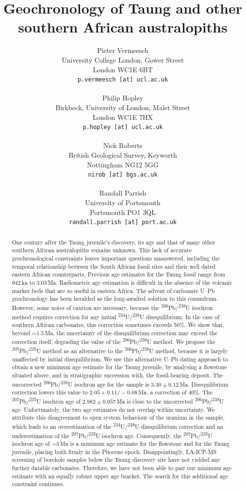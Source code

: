 \documentclass[11pt]{article}
\title{Geochronology of Taung and other southern African australopiths}
\author{Pieter Vermeesch\\
  University College London, Gower Street\\
  London WC1E 6BT\\
  \texttt{p.vermeesch [at] ucl.ac.uk}\\~\\
  Philip Hopley \\
  Birkbeck, University of London, Malet Street\\
  London WC1E 7HX\\
  \texttt{p.hopley [at] ucl.ac.uk}\\~\\
  Nick Roberts \\
  British Geological Survey, Keyworth\\
  Nottingham NG12 5GG \\
  \texttt{nirob [at] bgs.ac.uk}\\~\\
  Randall Parrish \\
  University of Portsmouth\\
  Portsmouth PO1 3QL\\
  \texttt{randall.parrish [at] port.ac.uk}
  }
\begin{document}
\maketitle

\begin{abstract}
  One century after the Taung juvenile's discovery, its age and that
  of many other southern African australopiths remains unknown.  This
  lack of accurate geochronological constraints leaves important
  questions unanswered, including the temporal relationship between
  the South African fossil sites and their well dated eastern African
  counterparts.  Previous age estimates for the Taung fossil range
  from 942\,ka to 3.03\,Ma. Radiometric age estimation is difficult in
  the absence of the volcanic marker beds that are so useful in
  eastern Africa. The advent of carbonate U--Pb geochronology has been
  heralded as the long-awaited solution to this conundrum. However,
  some notes of caution are necessary, because the
  \textsuperscript{206}Pb/\textsuperscript{238}U isochron method
  requires correction for any initial
  \textsuperscript{234}U/\textsuperscript{238}U disequilibrium. In the
  case of southern African carbonates, this correction sometimes
  exceeds 50\%. We show that, beyond $\sim{1.5}$\,Ma, the uncertainty
  of the disequilibrium correction may exceed the correction itself,
  degrading the value of the
  \textsuperscript{206}Pb/\textsuperscript{238}U method.  We propose
  the \textsuperscript{207}Pb/\textsuperscript{235}U method as an
  alternative to the \textsuperscript{206}Pb/\textsuperscript{238}U
  method, because it is largely unaffected by initial disequilibrium.
  We use this alternative U--Pb dating approach to obtain a new
  minimum age estimate for the Taung juvenile, by analysing a
  flowstone situated above, and in stratigraphic succession with, the
  fossil-bearing deposit.  The uncorrected
  \textsuperscript{206}Pb/\textsuperscript{238}U isochron age for the
  sample is $3.30\pm{0.12}$\,Ma. Disequilibrium correction lowers this
  value to $2.05+0.11/-0.08$\,Ma, a correction of 40\%. The
  \textsuperscript{207}Pb/\textsuperscript{235}U isochron age of
  $2.982\pm{0.057}$\,Ma is close to the uncorrected
  \textsuperscript{206}Pb/\textsuperscript{238}U age. Unfortunately,
  the two age estimates do not overlap within uncertainty. We
  attribute this disagreement to open system behaviour of the uranium
  in the sample, which leads to an overestimation of the
  \textsuperscript{234}U/\textsuperscript{238}U disequilibrium
  correction and an underestimation of the
  \textsuperscript{207}Pb/\textsuperscript{235}U isochron age.
  Consequently, the \textsuperscript{207}Pb/\textsuperscript{235}U
  isochron age of $\sim{3}$\,Ma is a minimum age estimate for the
  flowstone and for the Taung juvenile, placing both firmly in the
  Pliocene epoch. Disappointingly, LA-ICP-MS screening of borehole
  samples below the Taung discovery site have not yielded any further
  datable carbonates. Therefore, we have not been able to pair our
  minimum age estimate with an equally robust upper age bracket. The
  search for this additional age constraint continues.
\end{abstract}
\end{document}
